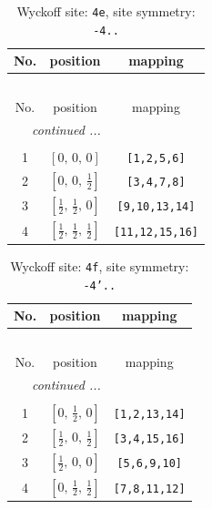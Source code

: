 \documentclass[fleqn,8pt]{jsarticle}
\begin{document}
\renewcommand{\arraystretch}{1.2}
\begin{longtable}{ccc}
\caption{Wyckoff site: {\tt 4e}, site symmetry: {\tt -4..}}
 \\
 \hline \hline
No. & position & mapping \\ \hline \endfirsthead

\multicolumn{2}{l}{\tablename\ \thetable{}} \\
 \hline \hline
No. & position & mapping \\ \hline \endhead

 \hline \hline
\multicolumn{2}{r}{\footnotesize\it continued ...} \\ \endfoot

 \hline \hline
\multicolumn{2}{r}{} \\ \endlastfoot

1 & $\left[ 0,\, 0,\, 0 \right]$ & {\tt [1,2,5,6]} \\ \hline
2 & $\left[ 0,\, 0,\, \frac{1}{2} \right]$ & {\tt [3,4,7,8]} \\ \hline
3 & $\left[ \frac{1}{2},\, \frac{1}{2},\, 0 \right]$ & {\tt [9,10,13,14]} \\ \hline
4 & $\left[ \frac{1}{2},\, \frac{1}{2},\, \frac{1}{2} \right]$ & {\tt [11,12,15,16]} \\
\end{longtable}
\renewcommand{\arraystretch}{1.2}
\begin{longtable}{ccc}
\caption{Wyckoff site: {\tt 4f}, site symmetry: {\tt -4'..}}
 \\
 \hline \hline
No. & position & mapping \\ \hline \endfirsthead

\multicolumn{2}{l}{\tablename\ \thetable{}} \\
 \hline \hline
No. & position & mapping \\ \hline \endhead

 \hline \hline
\multicolumn{2}{r}{\footnotesize\it continued ...} \\ \endfoot

 \hline \hline
\multicolumn{2}{r}{} \\ \endlastfoot

1 & $\left[ 0,\, \frac{1}{2},\, 0 \right]$ & {\tt [1,2,13,14]} \\ \hline
2 & $\left[ \frac{1}{2},\, 0,\, \frac{1}{2} \right]$ & {\tt [3,4,15,16]} \\ \hline
3 & $\left[ \frac{1}{2},\, 0,\, 0 \right]$ & {\tt [5,6,9,10]} \\ \hline
4 & $\left[ 0,\, \frac{1}{2},\, \frac{1}{2} \right]$ & {\tt [7,8,11,12]} \\
\end{longtable}
\end{document}
